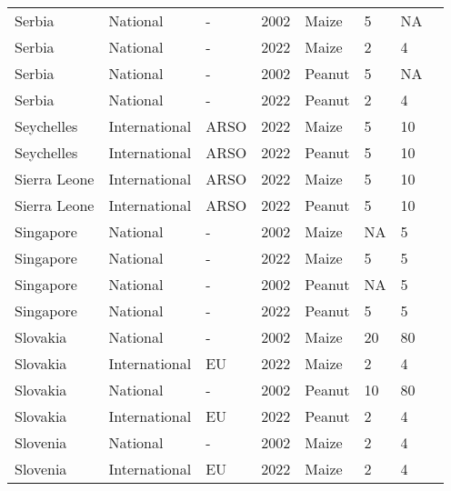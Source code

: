 \begin{landscape}
\begin{longtable}[c]{llllllll}
Serbia            & National      & -        & 2002 & Maize  & 5  & NA & \citet{van2004worldwide}     \\
Serbia            & National      & -        & 2022 & Maize  & 2  & 4  & \citet{RS2019}               \\
Serbia            & National      & -        & 2002 & Peanut & 5  & NA & \citet{van2004worldwide}     \\
Serbia            & National      & -        & 2022 & Peanut & 2  & 4  & \citet{RS2019}               \\
Seychelles        & International & ARSO     & 2022 & Maize  & 5  & 10 & \citet{ARSO2022}             \\
Seychelles        & International & ARSO     & 2022 & Peanut & 5  & 10 & \citet{ARSO2022}             \\
Sierra Leone      & International & ARSO     & 2022 & Maize  & 5  & 10 & \citet{ARSO2022}             \\
Sierra Leone      & International & ARSO     & 2022 & Peanut & 5  & 10 & \citet{ARSO2022}             \\
Singapore         & National      & -        & 2002 & Maize  & NA & 5  & \citet{van2004worldwide}     \\
Singapore         & National      & -        & 2022 & Maize  & 5  & 5  & \citet{SFA2019}              \\
Singapore         & National      & -        & 2002 & Peanut & NA & 5  & \citet{van2004worldwide}     \\
Singapore         & National      & -        & 2022 & Peanut & 5  & 5  & \citet{SFA2019}              \\
Slovakia          & National      & -        & 2002 & Maize  & 20 & 80 & \citet{van2004worldwide}     \\
Slovakia          & International & EU       & 2022 & Maize  & 2  & 4  & \citet{EC2010}               \\
Slovakia          & National      & -        & 2002 & Peanut & 10 & 80 & \citet{van2004worldwide}     \\
Slovakia          & International & EU       & 2022 & Peanut & 2  & 4  & \citet{EC2010}               \\
Slovenia          & National      & -        & 2002 & Maize  & 2  & 4  & \citet{van2004worldwide}     \\
Slovenia          & International & EU       & 2022 & Maize  & 2  & 4  & \citet{EC2010}               \\

\end{longtable}
\end{landscape}
